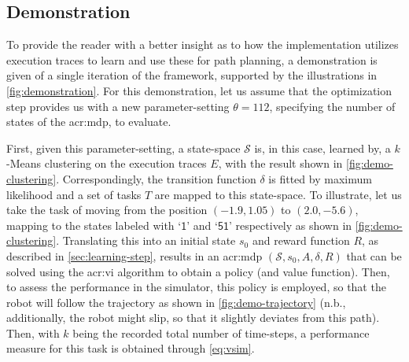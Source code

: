 \newpage

\subsection{Demonstration}
\label{sec:demonstration}

To provide the reader with a better insight as to how the implementation utilizes execution traces to learn  and use these for path planning, a demonstration is given of a single iteration of the framework, supported by the illustrations in \autoref{fig:demonstration}.
For this demonstration, let us assume that the optimization step provides us with a new parameter-setting $\theta = 112$, specifying the number of states of the \acrshort{acr:mdp}, to evaluate.

First, given this parameter-setting, a state-space $\mathcal{S}$ is, in this case, learned by, a $k$-Means clustering on the execution traces $E$, with the result shown in \autoref{fig:demo-clustering}.
Correspondingly, the transition function $\delta$ is fitted by maximum likelihood and a set of tasks $T$ are mapped to this state-space.
To illustrate, let us take the task of moving from the position $(-1.9, 1.05)$ to $(2.0, -5.6)$, mapping to the states labeled with `$\mathsf{1}$' and `$\mathsf{51}$' respectively as shown in \autoref{fig:demo-clustering}.
Translating this into an initial state $s_0$ and reward function $R$, as described in \autoref{sec:learning-step}, results in an \acrshort{acr:mdp} $(\mathcal{S}, s_0, A, \delta, R)$ that can be solved using the \acrshort{acr:vi} algorithm to obtain a policy (and value function).
Then, to assess the performance in the simulator, this policy is employed, so that the robot will follow the trajectory as shown in \autoref{fig:demo-trajectory} (n.b., additionally, the robot might slip, so that it slightly deviates from this path).
Then, with $k$ being the recorded total number of time-steps, a performance measure for this task is obtained through \autoref{eq:vsim}.

%


